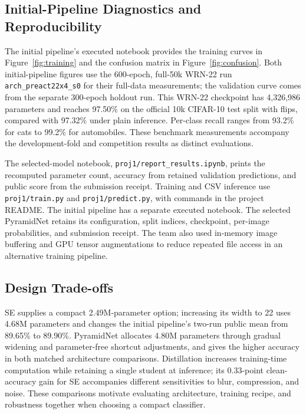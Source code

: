\documentclass[letterpaper]{article} %
\begin{document}
\subsection{Initial-Pipeline Diagnostics and Reproducibility}
The initial pipeline's executed notebook provides the training curves in Figure~\ref{fig:training} and the confusion matrix in Figure~\ref{fig:confusion}. Both initial-pipeline figures use the 600-epoch, full-50k WRN-22 run \texttt{arch\_preact22x4\_s0} for their full-data measurements; the validation curve comes from the separate 300-epoch holdout run. This WRN-22 checkpoint has 4,326,986 parameters and reaches 97.50\% on the official 10k CIFAR-10 test split with flips, compared with 97.32\% under plain inference. Per-class recall ranges from 93.2\% for cats to 99.2\% for automobiles. These benchmark measurements accompany the development-fold and competition results as distinct evaluations.



The selected-model notebook, \texttt{proj1/report\_results.ipynb}, prints the recomputed parameter count, accuracy from retained validation predictions, and public score from the submission receipt. Training and CSV inference use \texttt{proj1/train.py} and \texttt{proj1/predict.py}, with commands in the project README. The initial pipeline has a separate executed notebook. The selected PyramidNet retains its configuration, split indices, checkpoint, per-image probabilities, and submission receipt. The team also used in-memory image buffering and GPU tensor augmentations to reduce repeated file access in an alternative training pipeline.

\subsection{Design Trade-offs}
SE supplies a compact 2.49M-parameter option; increasing its width to 22 uses 4.68M parameters and changes the initial pipeline's two-run public mean from 89.65\% to 89.90\%. PyramidNet allocates 4.80M parameters through gradual widening and parameter-free shortcut adjustments, and gives the higher accuracy in both matched architecture comparisons. Distillation increases training-time computation while retaining a single student at inference; its 0.33-point clean-accuracy gain for SE accompanies different sensitivities to blur, compression, and noise. These comparisons motivate evaluating architecture, training recipe, and robustness together when choosing a compact classifier.
\end{document}
